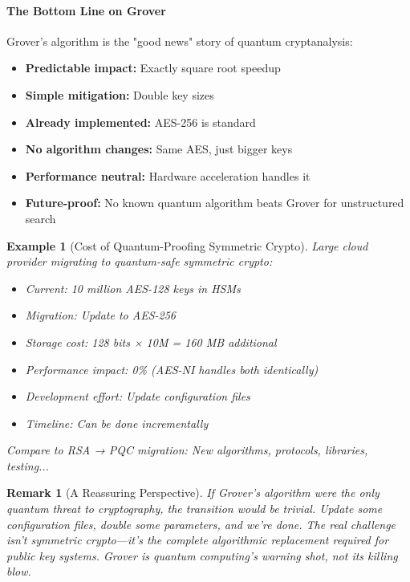 \documentclass[11pt,a4paper]{article}
\newtheorem{example}{Example}
\newtheorem{remark}{Remark}
\begin{document}
\paragraph{The Bottom Line on Grover}

Grover's algorithm is the "good news" story of quantum cryptanalysis:

\begin{itemize}
    \item \textbf{Predictable impact:} Exactly square root speedup
    \item \textbf{Simple mitigation:} Double key sizes
    \item \textbf{Already implemented:} AES-256 is standard
    \item \textbf{No algorithm changes:} Same AES, just bigger keys
    \item \textbf{Performance neutral:} Hardware acceleration handles it
    \item \textbf{Future-proof:} No known quantum algorithm beats Grover for unstructured search
\end{itemize}

\begin{example}[Cost of Quantum-Proofing Symmetric Crypto]
Large cloud provider migrating to quantum-safe symmetric crypto:
\begin{itemize}
    \item Current: 10 million AES-128 keys in HSMs
    \item Migration: Update to AES-256
    \item Storage cost: 128 bits × 10M = 160 MB additional
    \item Performance impact: 0\% (AES-NI handles both identically)
    \item Development effort: Update configuration files
    \item Timeline: Can be done incrementally
\end{itemize}
Compare to RSA → PQC migration: New algorithms, protocols, libraries, testing...
\end{example}

\begin{remark}[A Reassuring Perspective]
If Grover's algorithm were the only quantum threat to cryptography, the transition would be trivial. Update some configuration files, double some parameters, and we're done. The real challenge isn't symmetric crypto---it's the complete algorithmic replacement required for public key systems. Grover is quantum computing's warning shot, not its killing blow.
\end{remark}
\end{document}
